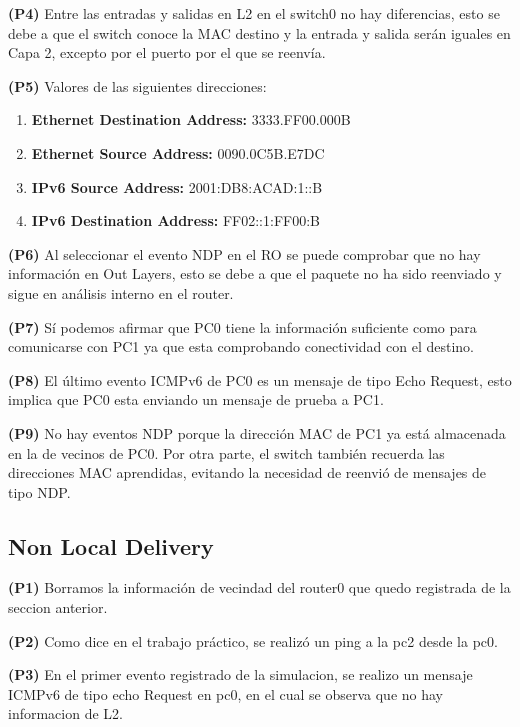 \documentclass[12pt]{article}
\begin{document}
\textbf{(P4)} Entre las entradas y salidas en L2 en el switch0 no hay diferencias, esto se debe a que el switch conoce la MAC destino y la entrada y salida serán iguales en Capa 2, excepto por el puerto por el que se reenvía.

\textbf{(P5)} Valores de las siguientes direcciones:

\begin{enumerate}
	\item \textbf{Ethernet Destination Address:} 3333.FF00.000B
	
	\item \textbf{Ethernet Source Address:} 0090.0C5B.E7DC
	
	\item \textbf{IPv6 Source Address:} 2001:DB8:ACAD:1::B
	
	\item \textbf{IPv6 Destination Address:} FF02::1:FF00:B
\end{enumerate}

\textbf{(P6)} Al seleccionar el  evento NDP en el RO se puede comprobar que no hay información en Out Layers, esto se debe a que el paquete no ha sido reenviado y sigue en análisis interno en el router.

\textbf{(P7)} Sí podemos afirmar que PC0 tiene la información suficiente como para comunicarse con PC1 ya que esta comprobando conectividad con el destino.

\textbf{(P8)} El último evento ICMPv6 de PC0 es un mensaje de tipo Echo Request, esto implica que PC0 esta enviando un mensaje de prueba a PC1.

\textbf{(P9)}  No hay eventos NDP porque la dirección MAC de PC1 ya está almacenada en la de vecinos de PC0. Por otra parte, el switch también recuerda las direcciones MAC aprendidas, evitando la necesidad de reenvió de mensajes de tipo NDP.

\subsection{Non Local Delivery}
 
\textbf{(P1)} Borramos la información de vecindad del router0 que quedo registrada de la seccion anterior.
 
 \textbf{(P2)} Como dice en el trabajo práctico, se realizó un ping a la pc2 desde la pc0.
 
 \textbf{(P3)} En el primer evento registrado de la simulacion, se realizo un mensaje ICMPv6 de tipo echo Request en pc0, en el cual se observa que no hay informacion de L2.
 
\end{document}
